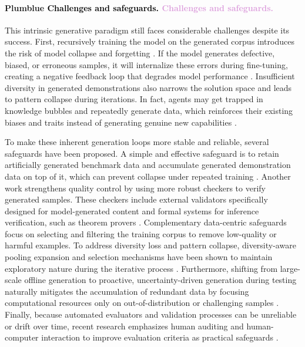 \documentclass{article}
\let\oldtextcolor\textcolor
\renewcommand{\textcolor}[2]{
  \def\temp{#1}
  \def\red{blue}
  \ifx\temp\red
    \oldtextcolor{black}{#2}
  \else
    \oldtextcolor{#1}{#2}
  \fi
}
\begin{document}
\paragraph{\textcolor{Plum}{Challenges and safeguards.}}
This intrinsic generative paradigm still faces considerable challenges despite its success. First, recursively training the model on the generated corpus introduces the risk of model collapse and forgetting \citep{shumailov2024ai,shumailov2024curserecursiontraininggenerated}. If the model generates defective, biased, or erroneous samples, it will internalize these errors during fine-tuning, creating a negative feedback loop that degrades model performance \citep{zhao2024selfguidebettertaskspecificinstruction, wang2022self}. Insufficient diversity in generated demonstrations also narrows the solution space and leads to pattern collapse during iterations. In fact, agents may get trapped in knowledge bubbles and repeatedly generate data, which reinforces their existing biases and traits instead of generating genuine new capabilities \citep{wu2025progress, yuan2025superficial}.


To make these inherent generation loops more stable and reliable, several safeguards have been proposed. A simple and effective safeguard is to retain artificially generated benchmark data and accumulate generated demonstration data on top of it, which can prevent collapse under repeated training \citep{gerstgrasser2024is}. Another work strengthens quality control by using more robust checkers to verify generated samples. These checkers include external validators specifically designed for model-generated content \citep{yi2025escapingmodelcollapsesynthetic} and formal systems for inference verification, such as theorem provers \citep{Leang_2025}. Complementary data-centric safeguards focus on selecting and filtering the training corpus to remove low-quality or harmful examples. To address diversity loss and pattern collapse, diversity-aware pooling expansion and selection mechanisms have been shown to maintain exploratory nature during the iterative process \citep{qin2025dive}. Furthermore, shifting from large-scale offline generation to proactive, uncertainty-driven generation during testing naturally mitigates the accumulation of redundant data by focusing computational resources only on out-of-distribution or challenging samples \citep{acikgoz2025selfimprovingllmagentstesttime}. Finally, because automated evaluators and validation processes can be unreliable or drift over time, recent research emphasizes human auditing and human-computer interaction to improve evaluation criteria as practical safeguards \citep{10.1145/3731120.3744588, do2025generateevaluateiteratesynthetic}.
\end{document}
